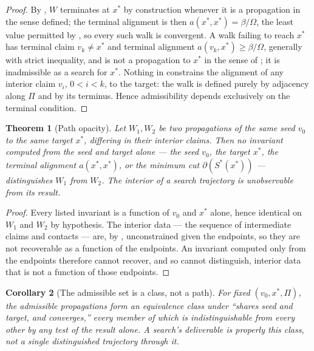 \documentclass[11pt,twocolumn,a4paper]{article}
\theoremstyle{thmstyle}
\newtheorem{theorem}{Theorem}[section]
\newtheorem{corollary}[theorem]{Corollary}
\theoremstyle{definition}
\theoremstyle{remark}
\newcommand{\flo}{\beta}
\newcommand{\cut}{\partial}
\newcommand{\Walk}{W}
\newcommand{\Proc}{\Pi}
\begin{document}
\begin{proof}
By , $\Walk$ terminates at $x^{\ast}$ by construction
whenever it is a propagation in the sense defined; the terminal alignment
is then $a(x^{\ast},x^{\ast})=\flo/\Omega$, the least value permitted by
, so every such walk is convergent. A walk failing to
reach $x^{\ast}$ has terminal claim $v_k\neq x^{\ast}$ and terminal
alignment $a(v_k,x^{\ast})\ge\flo/\Omega$, generally with strict
inequality, and is not a propagation to $x^{\ast}$ in the sense of
; it is inadmissible as a search for $x^{\ast}$.
Nothing in  constrains the alignment of any interior
claim $v_i$, $0<i<k$, to the target: the walk is defined purely by
adjacency along $\Proc$ and by its terminus. Hence admissibility depends
exclusively on the terminal condition.
\end{proof}

\begin{theorem}[Path opacity]
\label{thm:path-opacity}
Let $\Walk_1,\Walk_2$ be two propagations of the same seed $v_0$ to the
same target $x^{\ast}$, differing in their interior claims. Then no
invariant computed from the seed and target alone --- the seed $v_0$, the
target $x^{\ast}$, the terminal alignment $a(x^{\ast},x^{\ast})$, or the
minimum cut $\cut(S^{\ast}(x^{\ast}))$ --- distinguishes $\Walk_1$ from
$\Walk_2$. The interior of a search trajectory is unobservable from its
result.
\end{theorem}

\begin{proof}
Every listed invariant is a function of $v_0$ and $x^{\ast}$ alone, hence
identical on $\Walk_1$ and $\Walk_2$ by hypothesis. The interior data ---
the sequence of intermediate claims and contacts --- are, by
, unconstrained given the endpoints, so they are
not recoverable as a function of the endpoints. An invariant computed only
from the endpoints therefore cannot recover, and so cannot distinguish,
interior data that is not a function of those endpoints.
\end{proof}

\begin{corollary}[The admissible set is a class, not a path]
\label{cor:gauge}
For fixed $(v_0,x^{\ast},\Proc)$, the admissible propagations form an
equivalence class under ``shares seed and target, and converges,'' every
member of which is indistinguishable from every other by any test of the
result alone. A search's deliverable is properly this class, not a single
distinguished trajectory through it.
\end{corollary}
\end{document}
